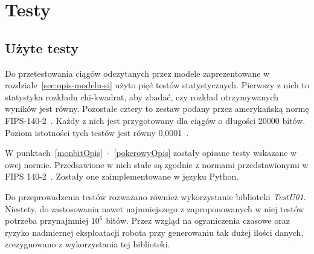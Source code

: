 \chapter{Testy}

\section{Użyte testy}
\label{testyOpis}

Do przetestowania ciągów odczytanych przez modele zaprezentowane w rozdziale~\ref{sec:opis-modelu-si} użyto pięć
testów statystycznych. Pierwszy z nich to statystyka rozkładu chi-kwadrat, aby zbadać, czy rozkład otrzymywanych 
wyników jest równy. Pozostałe cztery to zestaw podany przez amerykańską normę FIPS-140-2~\cite{NIST2001}. Każdy z nich
jest przygotowany dla ciągów o długości 20000 bitów. Poziom istotności tych testów jest równy 0{,}0001~\cite{Kotulski2001}.


W punktach~\ref{monbitOpis}~-~\ref{pokerowyOpis} zostały opisane testy wskazane w owej normie. Przedsawione w nich stałe
są zgodnie z normami przedstawionymi w FIPS 140-2~\cite{NIST2001}. Zostały one zaimplementowane w języku Python.
\par
Do przeprowadzenia testów rozważano również wykorzystanie biblioteki \textit{TestU01}. Niestety, do zastosowania nawet 
najmniejszego z zaproponowanych w niej testów potrzeba przynajmniej \begin{math} 10^6 \end{math} bitów. Przez 
wzgląd na ograniczenia czasowe oraz ryzyko nadmiernej eksploatacji robota przy generowaniu tak dużej ilości danych, 
zrezygnowano z wykorzystania tej biblioteki.



